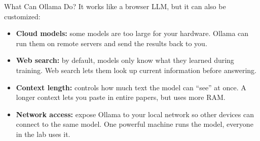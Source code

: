 \documentclass[aspectratio=169]{beamer}
\begin{document}
\begin{frame}{What Can Ollama Do?}
    It works like a browser LLM, but it can also be customized:
    \begin{itemize}
        \vspace{0.3em}
        \item \textbf{Cloud models:} some models are too large for your hardware. Ollama can run them on remote servers and send the results back to you.
        \vspace{0.3em}
        \item \textbf{Web search:} by default, models only know what they learned during training. Web search lets them look up current information before answering.
        \vspace{0.3em}
        \item \textbf{Context length:} controls how much text the model can ``see'' at once. A longer context lets you paste in entire papers, but uses more RAM.
        \vspace{0.3em}
        \item \textbf{Network access:} expose Ollama to your local network so other devices can connect to the same model. One powerful machine runs the model, everyone in the lab uses it.
    \end{itemize}
\end{frame}
\end{document}
